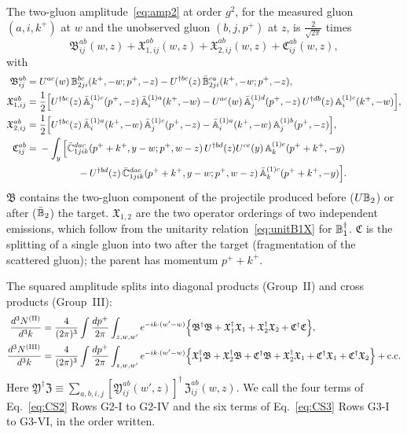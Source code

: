 The two-gluon amplitude~\eqref{eq:amp2} at order $g^2$, for the measured gluon $(a,i,k^+)$ at $w$ and the unobserved gluon $(b,j,p^+)$ at $z$, is $\frac{2}{\sqrt{2\pi}}$ times
\begin{equation}
\mathfrak B^{ab}_{ij}(w,z)+\mathfrak X^{ab}_{1,ij}(w,z)+\mathfrak X^{ab}_{2,ij}(w,z)+\mathfrak C^{ab}_{ij}(w,z),
\label{eq:amp2NLO}
\end{equation}
with
\begin{align}
\mathfrak B^{ab}_{ij}={}&U^{ac}(w)\,\mathbb{B}^{bc}_{2ji}(k^+,-w;p^+,-z)-U^{\dagger bc}(z)\,\bar{\mathbb{B}}^{ca}_{2ji}(k^+,-w;p^+,-z),\label{eq:frakB}\\
\mathfrak X^{ab}_{1,ij}={}&\frac12\Big[U^{\dagger bc}(z)\,\bar{\mathbb{A}}^{(1)c}_j(p^+,-z)\,\bar{\mathbb{A}}^{(1)a}_i(k^+,-w)-U^{ac}(w)\,\bar{\mathbb{A}}^{(1)d}_j(p^+,-z)\,U^{\dagger db}(z)\,\mathbb{A}^{(1)c}_i(k^+,-w)\Big],\label{eq:frakX1}\\
\mathfrak X^{ab}_{2,ij}={}&\frac12\Big[U^{\dagger bc}(z)\,\bar{\mathbb{A}}^{(1)a}_i(k^+,-w)\,\bar{\mathbb{A}}^{(1)c}_j(p^+,-z)-\bar{\mathbb{A}}^{(1)a}_i(k^+,-w)\,\mathbb{A}^{(1)b}_j(p^+,-z)\Big],\label{eq:frakX2}\\
\mathfrak C^{ab}_{ij}={}&-\int_y\Big[\bar{\mathbb{C}}^{dac}_{1jik}(p^++k^+,y-w;p^+,w-z)\,U^{\dagger bd}(z)U^{ce}(y)\,\mathbb{A}^{(1)e}_k(p^++k^+,-y)\notag\\
&\hspace{4em}-U^{\dagger bd}(z)\,\bar{\mathbb{C}}^{dac}_{1jik}(p^++k^+,y-w;p^+,w-z)\,\bar{\mathbb{A}}^{(1)c}_k(p^++k^+,-y)\Big].\label{eq:frakC}
\end{align}
$\mathfrak B$ contains the two-gluon component of the projectile produced before ($U\mathbb{B}_2$) or after ($\bar{\mathbb{B}}_2$) the target. $\mathfrak X_{1,2}$ are the two operator orderings of two independent emissions, which follow from the unitarity relation~\eqref{eq:unitB1X} for $\mathbb{B}_1^\dagger$. $\mathfrak C$ is the splitting of a single gluon into two after the target (fragmentation of the scattered gluon); the parent has momentum $p^++k^+$.

The squared amplitude splits into diagonal products (Group~II) and cross products (Group~III):
\begin{align}
\frac{d^3N^{\rm (II)}}{d^3k}={}&\frac{4}{(2\pi)^3}\int\frac{dp^+}{2\pi}\int_{z,w,w'}e^{-ik\cdot(w'-w)}\Big\{\mathfrak B^\dagger\mathfrak B+\mathfrak X_1^\dagger\mathfrak X_1+\mathfrak X_2^\dagger\mathfrak X_2+\mathfrak C^\dagger\mathfrak C\Big\},\label{eq:CS2}\\
\frac{d^3N^{\rm (III)}}{d^3k}={}&\frac{4}{(2\pi)^3}\int\frac{dp^+}{2\pi}\int_{z,w,w'}e^{-ik\cdot(w'-w)}\Big\{\mathfrak X_1^\dagger\mathfrak B+\mathfrak X_2^\dagger\mathfrak B+\mathfrak C^\dagger\mathfrak B+\mathfrak X_2^\dagger\mathfrak X_1+\mathfrak C^\dagger\mathfrak X_1+\mathfrak C^\dagger\mathfrak X_2\Big\}+{\rm c.c.}\label{eq:CS3}
\end{align}
Here $\mathfrak Y^\dagger\mathfrak Z\equiv\sum_{a,b,i,j}[\mathfrak Y^{ab}_{ij}(w',z)]^\dagger\,\mathfrak Z^{ab}_{ij}(w,z)$. We call the four terms of Eq.~\eqref{eq:CS2} Rows G2-I to G2-IV and the six terms of Eq.~\eqref{eq:CS3} Rows G3-I to G3-VI, in the order written.

